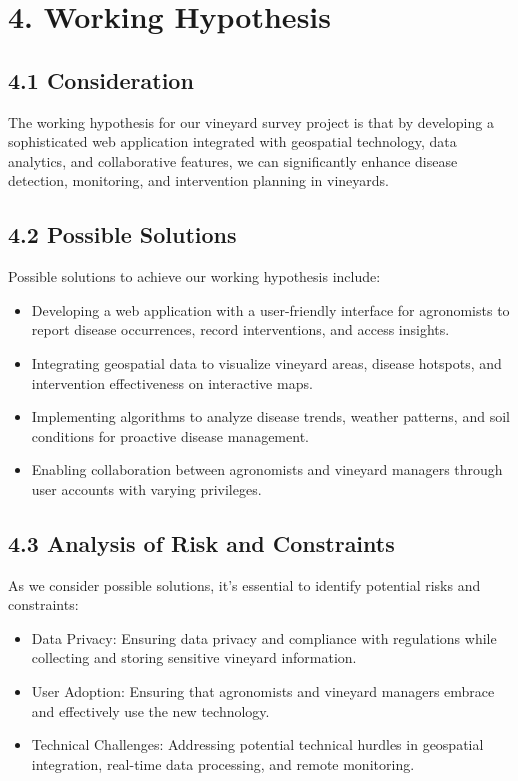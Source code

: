 \section{4. Working Hypothesis}

\subsection{4.1 Consideration}
The working hypothesis for our vineyard survey project is that by developing a sophisticated web application integrated with geospatial technology, data analytics, and collaborative features, we can significantly enhance disease detection, monitoring, and intervention planning in vineyards.

\subsection{4.2 Possible Solutions}
Possible solutions to achieve our working hypothesis include:
\begin{itemize}
    \item Developing a web application with a user-friendly interface for agronomists to report disease occurrences, record interventions, and access insights.
    \item Integrating geospatial data to visualize vineyard areas, disease hotspots, and intervention effectiveness on interactive maps.
    \item Implementing algorithms to analyze disease trends, weather patterns, and soil conditions for proactive disease management.
    \item Enabling collaboration between agronomists and vineyard managers through user accounts with varying privileges.
\end{itemize}

\subsection{4.3 Analysis of Risk and Constraints}
As we consider possible solutions, it's essential to identify potential risks and constraints:
\begin{itemize}
    \item Data Privacy: Ensuring data privacy and compliance with regulations while collecting and storing sensitive vineyard information.
    \item User Adoption: Ensuring that agronomists and vineyard managers embrace and effectively use the new technology.
    \item Technical Challenges: Addressing potential technical hurdles in geospatial integration, real-time data processing, and remote monitoring.
\end{itemize}

